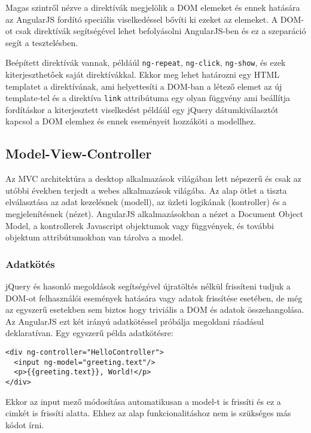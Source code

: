 Magas szintről nézve a direktívák megjelölik a DOM elemeket és ennek hatására az AngularJS fordító speciális viselkedéssel bővíti ki ezeket az elemeket. A DOM-ot csak direktívák segítségével lehet befolyásolni AngularJS-ben és ez a szeparáció segít a tesztelésben. 

Beépített direktívák vannak, példáúl \lstinline{ng-repeat}, \lstinline{ng-click}, \lstinline{ng-show}, és ezek kiterjeszthetőek saját direktívákkal. Ekkor meg lehet határozni egy HTML templatet a direktívának, ami helyettesíti a DOM-ban a létező elemet az új template-tel és a direktíva \lstinline{link} attribútuma egy olyan függvény ami beállítja fordításkor a kiterjesztett viselkedést példáúl egy jQuery dátumkiválasztót kapcsol a DOM elemhez és ennek eseményeit hozzáköti a modellhez.


\subsection{Model-View-Controller}

Az MVC architektúra a desktop alkalmazások világában lett népszerű és csak az utóbbi években terjedt a webes alkalmazások világába. Az alap ötlet a tiszta elválasztása az adat kezelésnek (modell), az üzleti logikának (kontroller) és a megjelenítésnek (nézet). AngularJS alkalmazásokban a nézet a Document Object Model, a kontrollerek Javascript objektumok vagy függvények, és további objektum attribútumokban van tárolva a model.   

\subsubsection{Adatkötés}

jQuery és hasonló megoldások segítségével újratöltés nélkül frissíteni tudjuk a DOM-ot felhasználói események hatására vagy adatok frissítése esetében, de még az egyszerű esetekben sem biztos hogy triviális a DOM és adatok összehangolása. Az AngularJS ezt két irányú adatkötéssel próbálja megoldani ráadásul deklaratívan. Egy egyszerű példa adatkötésre:

\lstset{language=HTML}
\begin{lstlisting}[frame=single]  
<div ng-controller="HelloController">
  <input ng-model="greeting.text"/>
  <p>{{greeting.text}}, World!</p>
</div>
\end{lstlisting}
Ekkor az input mező módosítása automatikusan a model-t is frissíti és ez a cimkét is frissíti alatta. Ehhez az alap funkcionalitáshoz nem is szükséges más kódot írni.


